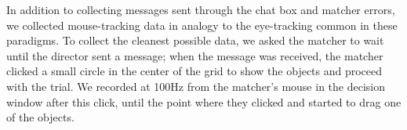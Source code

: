 \documentclass[manuscript]{stjour}
\begin{document}
In addition to collecting messages sent through the chat box and matcher errors, we collected mouse-tracking data in analogy to the eye-tracking common in these paradigms. To collect the cleanest possible data, we asked the matcher to wait until the director sent a message; when the message was received, the matcher clicked a small circle in the center of the grid to show the objects and proceed with the trial. We recorded at 100Hz from the matcher's mouse in the decision window after this click, until the point where they clicked and started to drag one of the objects. 





\end{document}
